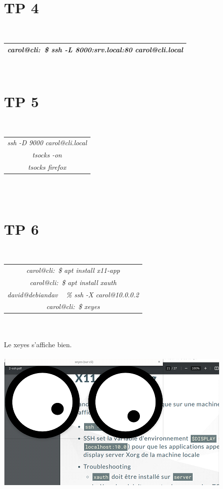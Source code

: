 \documentclass{report}
\begin{document}
\section{TP 4}
\\
\begin{tabular}{|c|}
\hline
\textit{carol@cli:~\$ ssh -L 8000:srv.local:80 carol@cli.local}\\
\hline
\end{tabular}
\\
\section{TP 5}
\\
\begin{tabular}{|c|}
\hline
\textit{ssh -D 9000 carol@cli.local}\\
\textit{tsocks -on}\\
\textit{tsocks firefox}\\
\hline
\end{tabular}
\\
\\
\section{TP 6}
\\
\begin{tabular}{|c|}
\hline
\textit{carol@cli:~\$ apt install x11-app}\\
\textit{carol@cli:~\$ apt install xauth}\\
\textit{david@debiandav ~ \% ssh -X carol@10.0.0.2}\\
\textit{carol@cli:~\$ xeyes}\\
\hline
\end{tabular}
\\
\\
Le xeyes s'affiche bien. 
\\
\\
\includegraphics{xeyes}
\\
\\
\end{document}
